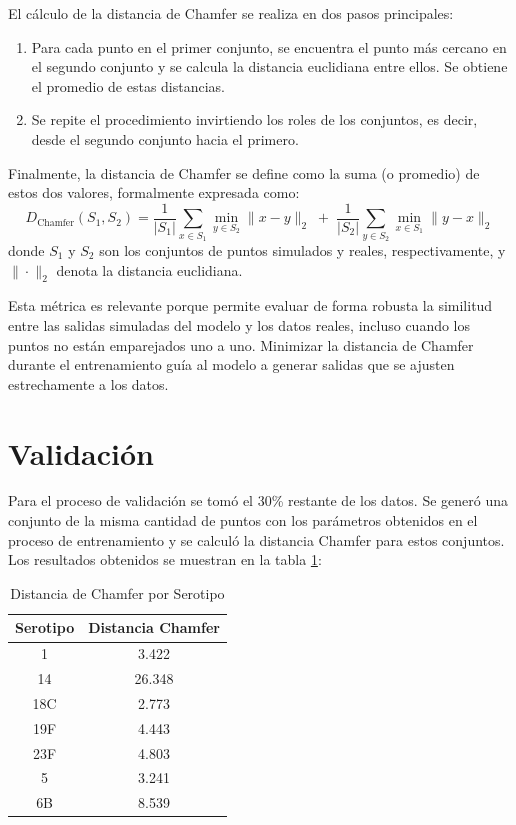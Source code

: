 El cálculo de la distancia de Chamfer se realiza en dos pasos principales:

\begin{enumerate}
    \item Para cada punto en el primer conjunto, se encuentra el punto más cercano en el segundo conjunto y se calcula la distancia euclidiana entre ellos. Se obtiene el promedio de estas distancias.
    \item Se repite el procedimiento invirtiendo los roles de los conjuntos, es decir, desde el segundo conjunto hacia el primero.
\end{enumerate}

Finalmente, la distancia de Chamfer se define como la suma (o promedio) de estos dos valores, formalmente expresada como:
\[
D_{\mathrm{Chamfer}}(S_1, S_2) = \frac{1}{|S_1|} \sum_{x \in S_1} \min_{y \in S_2} \|x - y\|_2 \;+\; \frac{1}{|S_2|} \sum_{y \in S_2} \min_{x \in S_1} \|y - x\|_2
\]
donde \( S_1 \) y \( S_2 \) son los conjuntos de puntos simulados y reales, respectivamente, y \(\|\cdot\|_2\) denota la distancia euclidiana.

Esta métrica es relevante porque permite evaluar de forma robusta la similitud entre las salidas simuladas del modelo y los datos reales, incluso cuando los puntos no están emparejados uno a uno. Minimizar la distancia de Chamfer durante el entrenamiento guía al modelo a generar salidas que se ajusten estrechamente a los datos.


\section{Validación}
Para el proceso de validación se tomó el 30\% restante de los datos. Se generó una conjunto de la misma cantidad de puntos con los parámetros obtenidos en el proceso de entrenamiento y se calculó la distancia Chamfer para estos conjuntos. Los resultados obtenidos se muestran en la tabla \ref{tab:chamfer_serotipos}:

\begin{table}[h]
\centering
\caption{Distancia de Chamfer por Serotipo}
\begin{tabular}{|c|c|}
\hline
\textbf{Serotipo} & \textbf{Distancia Chamfer} \\
\hline
1   & 3.422  \\
14  & 26.348 \\
18C & 2.773  \\
19F & 4.443  \\
23F & 4.803  \\
5   & 3.241  \\
6B  & 8.539  \\
\hline
\end{tabular}
\label{tab:chamfer_serotipos}
\end{table}

